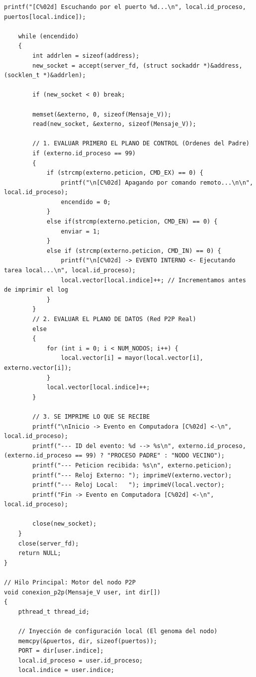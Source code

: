 \begin{lstlisting}[style=estiloC]
    printf("[C%02d] Escuchando por el puerto %d...\n", local.id_proceso, puertos[local.indice]);

    while (encendido)
    {
        int addrlen = sizeof(address);
        new_socket = accept(server_fd, (struct sockaddr *)&address, (socklen_t *)&addrlen);

        if (new_socket < 0) break;

        memset(&externo, 0, sizeof(Mensaje_V));
        read(new_socket, &externo, sizeof(Mensaje_V));

        // 1. EVALUAR PRIMERO EL PLANO DE CONTROL (Ordenes del Padre)
        if (externo.id_proceso == 99) 
        {
            if (strcmp(externo.peticion, CMD_EX) == 0) {
                printf("\n[C%02d] Apagando por comando remoto...\n\n", local.id_proceso);
                encendido = 0; 
            }
            else if(strcmp(externo.peticion, CMD_EN) == 0) {
                enviar = 1; 
            }
            else if (strcmp(externo.peticion, CMD_IN) == 0) {
                printf("\n[C%02d] -> EVENTO INTERNO <- Ejecutando tarea local...\n", local.id_proceso);
                local.vector[local.indice]++; // Incrementamos antes de imprimir el log
            }
        }
        // 2. EVALUAR EL PLANO DE DATOS (Red P2P Real)
        else 
        {
            for (int i = 0; i < NUM_NODOS; i++) {
                local.vector[i] = mayor(local.vector[i], externo.vector[i]);
            }
            local.vector[local.indice]++;
        }

        // 3. SE IMPRIME LO QUE SE RECIBE 
        printf("\nInicio -> Evento en Computadora [C%02d] <-\n", local.id_proceso);
        printf("--- ID del evento: %d --> %s\n", externo.id_proceso,(externo.id_proceso == 99) ? "PROCESO PADRE" : "NODO VECINO");
        printf("--- Peticion recibida: %s\n", externo.peticion);
        printf("--- Reloj Externo: "); imprimeV(externo.vector);
        printf("--- Reloj Local:   "); imprimeV(local.vector);
        printf("Fin -> Evento en Computadora [C%02d] <-\n", local.id_proceso);

        close(new_socket);
    }
    close(server_fd);
    return NULL;
}

// Hilo Principal: Motor del nodo P2P
void conexion_p2p(Mensaje_V user, int dir[])
{
    pthread_t thread_id;
    
    // Inyección de configuración local (El genoma del nodo)
    memcpy(&puertos, dir, sizeof(puertos));
    PORT = dir[user.indice];
    local.id_proceso = user.id_proceso;
    local.indice = user.indice;
    

\end{lstlisting}
